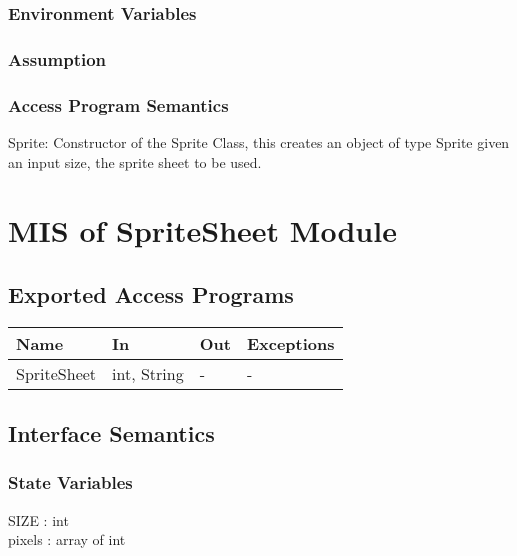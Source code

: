 \documentclass[12pt, letterpaper]{article}
\begin{document}
	\subsubsection{Environment Variables}
	
	\subsubsection{Assumption}
	
	\subsubsection{Access Program Semantics}
	
	Sprite: Constructor of the Sprite Class, this creates an object of type Sprite \indent given an input size, the sprite sheet to be used.\\
	
	\section{MIS of SpriteSheet Module}
	
	\subsection{Exported Access Programs}
	
			\begin{center}
				\begin{tabular}{ p{4cm} p{3cm} p{3cm} p{4cm} }
					\hline
					\textbf{Name} & \textbf{In} & \textbf{Out} & \textbf{Exceptions}\\ 
					\hline
					SpriteSheet & int, String & - & -  \\ 
					\hline
					
				\end{tabular}				
			\end{center}
	
	\subsection{Interface Semantics}
	
	\subsubsection{State Variables}
	
	SIZE : int \\
	pixels : array of int \\
	
\end{document}
